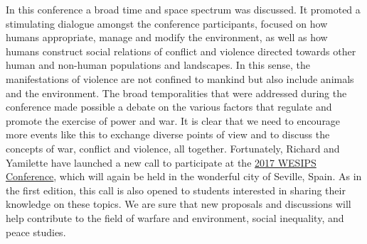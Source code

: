 In this conference a broad time and space spectrum was discussed. It promoted a stimulating dialogue amongst the conference participants, focused on how humans appropriate, manage and modify the environment, as well as how humans construct social relations of conflict and violence directed towards other human and non-human populations and landscapes. In this sense, the manifestations of violence are not confined to mankind but also include animals and the environment. The broad temporalities that were addressed during the conference made possible a debate on the various factors that regulate and promote the exercise of power and war.  It is clear that we need to encourage more events like this to exchange diverse points of view and to discuss the concepts of war, conflict and violence, all together. Fortunately, Richard and Yamilette have launched a new call to participate at the \href{https://www.academia.edu/14533728/WESIPS_2017_Conference}{2017 WESIPS Conference}, which will again be held in the wonderful city of Seville, Spain.  As in the first edition, this call is also opened to students interested in sharing their knowledge on these topics. We are sure that new proposals and discussions will help contribute to the field of warfare and environment, social inequality, and peace studies.





\label{WESIPS:lastpage}
\closingarticle
